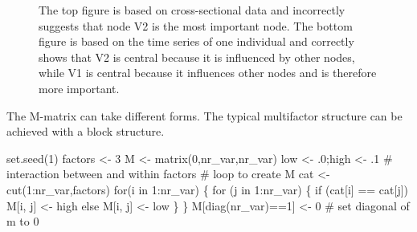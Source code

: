 \documentclass[
  a4paper,
  DIV=11,
  numbers=noendperiod,
  oneside]{scrreprt}
\newenvironment{Shaded}{}{}
\newcommand{\CommentTok}[1]{\textcolor[rgb]{0.42,0.45,0.49}{#1}}
\newcommand{\ControlFlowTok}[1]{\textcolor[rgb]{0.84,0.23,0.29}{#1}}
\newcommand{\DecValTok}[1]{\textcolor[rgb]{0.00,0.36,0.77}{#1}}
\newcommand{\FunctionTok}[1]{\textcolor[rgb]{0.44,0.26,0.76}{#1}}
\newcommand{\NormalTok}[1]{\textcolor[rgb]{0.14,0.16,0.18}{#1}}
\newcommand{\OtherTok}[1]{\textcolor[rgb]{0.44,0.26,0.76}{#1}}
\newcommand{\SpecialCharTok}[1]{\textcolor[rgb]{0.00,0.36,0.77}{#1}}
\begin{document}
\begin{figure}


\caption{\label{fig-ch6-img16-old-85}The top figure is based on
cross-sectional data and incorrectly suggests that node V2 is the most
important node. The bottom figure is based on the time series of one
individual and correctly shows that V2 is central because it is
influenced by other nodes, while V1 is central because it influences
other nodes and is therefore more important.}

\end{figure}%

The M-matrix can take different forms. The typical multifactor structure
can be achieved with a block structure.

\begin{Shaded}
\begin{Highlighting}[]
\FunctionTok{set.seed}\NormalTok{(}\DecValTok{1}\NormalTok{)}
\NormalTok{factors }\OtherTok{\textless{}{-}} \DecValTok{3}
\NormalTok{M }\OtherTok{\textless{}{-}} \FunctionTok{matrix}\NormalTok{(}\DecValTok{0}\NormalTok{,nr\_var,nr\_var)}
\NormalTok{low }\OtherTok{\textless{}{-}}\NormalTok{ .}\DecValTok{0}\NormalTok{;high }\OtherTok{\textless{}{-}}\NormalTok{ .}\DecValTok{1} \CommentTok{\# interaction between and within factors}
\CommentTok{\# loop to create M}
\NormalTok{cat }\OtherTok{\textless{}{-}} \FunctionTok{cut}\NormalTok{(}\DecValTok{1}\SpecialCharTok{:}\NormalTok{nr\_var,factors)}
\ControlFlowTok{for}\NormalTok{(i }\ControlFlowTok{in} \DecValTok{1}\SpecialCharTok{:}\NormalTok{nr\_var) \{}
  \ControlFlowTok{for}\NormalTok{ (j }\ControlFlowTok{in} \DecValTok{1}\SpecialCharTok{:}\NormalTok{nr\_var) \{}
    \ControlFlowTok{if}\NormalTok{ (cat[i] }\SpecialCharTok{==}\NormalTok{ cat[j])}
\NormalTok{      M[i, j] }\OtherTok{\textless{}{-}}\NormalTok{ high}
    \ControlFlowTok{else}
\NormalTok{      M[i, j] }\OtherTok{\textless{}{-}}\NormalTok{ low}
\NormalTok{  \}}
\NormalTok{\}}
\NormalTok{M[}\FunctionTok{diag}\NormalTok{(nr\_var)}\SpecialCharTok{==}\DecValTok{1}\NormalTok{] }\OtherTok{\textless{}{-}} \DecValTok{0} \CommentTok{\# set diagonal of m to 0}
\end{Highlighting}
\end{Shaded}
\end{document}
